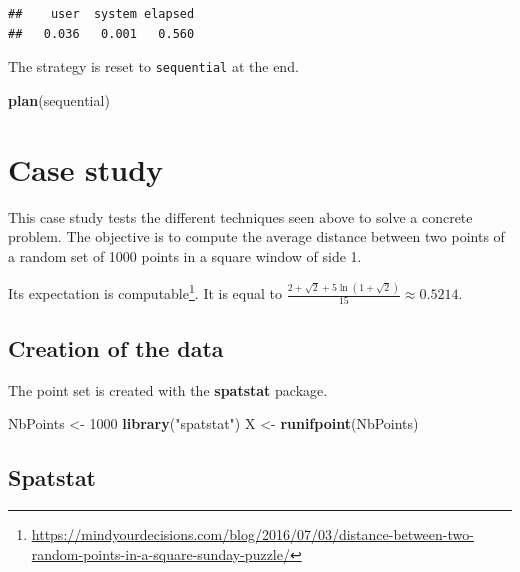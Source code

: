 \documentclass[
  12pt,
  american,
  a4paper,
  extrafontsizes,onecolumn,openright
  ]{memoir}
\newenvironment{Shaded}{\begin{snugshade}}{\end{snugshade}}
\newcommand{\DecValTok}[1]{\textcolor[rgb]{0.00,0.00,0.81}{#1}}
\newcommand{\FunctionTok}[1]{\textcolor[rgb]{0.13,0.29,0.53}{\textbf{#1}}}
\newcommand{\NormalTok}[1]{#1}
\newcommand{\OtherTok}[1]{\textcolor[rgb]{0.56,0.35,0.01}{#1}}
\newcommand{\StringTok}[1]{\textcolor[rgb]{0.31,0.60,0.02}{#1}}
\begin{document}
\begin{verbatim}
##    user  system elapsed 
##   0.036   0.001   0.560
\end{verbatim}

\normalsize

The strategy is reset to \texttt{sequential} at the end.

\scriptsize

\begin{Shaded}
\begin{Highlighting}[]
\FunctionTok{plan}\NormalTok{(sequential)}
\end{Highlighting}
\end{Shaded}

\normalsize

\section{Case study}\label{sec:cas}

This case study tests the different techniques seen above to solve a concrete problem.
The objective is to compute the average distance between two points of a random set of 1000 points in a square window of side 1.

Its expectation is computable\footnote{\url{https://mindyourdecisions.com/blog/2016/07/03/distance-between-two-random-points-in-a-square-sunday-puzzle/}}.
It is equal to \(\frac{2+\sqrt{2}+5\ln{(1+\sqrt{2})}}{15} \approx 0.5214\).

\subsection{Creation of the data}\label{creation-of-the-data}

The point set is created with the \textbf{spatstat} package.

\scriptsize

\begin{Shaded}
\begin{Highlighting}[]
\NormalTok{NbPoints }\OtherTok{\textless{}{-}} \DecValTok{1000}
\FunctionTok{library}\NormalTok{(}\StringTok{"spatstat"}\NormalTok{)}
\NormalTok{X }\OtherTok{\textless{}{-}} \FunctionTok{runifpoint}\NormalTok{(NbPoints)}
\end{Highlighting}
\end{Shaded}

\normalsize

\subsection{Spatstat}\label{spatstat}
\end{document}

